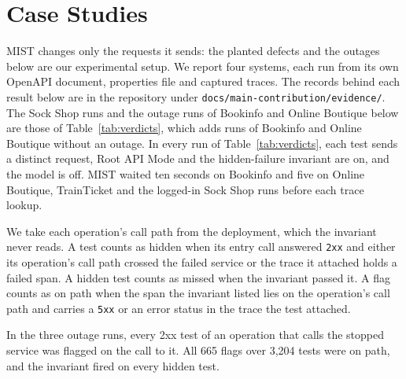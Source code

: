 \documentclass[10pt,conference]{IEEEtran}
\begin{document}
\section{Case Studies}\label{sec:case}

MIST changes only the requests it sends: the planted defects and the outages below are our experimental setup. We report four systems, each run from its own OpenAPI \mbox{document}, properties file and captured traces. The records behind each result below are in the repository under \texttt{docs/\allowbreak main-contribution/\allowbreak evidence/}. The Sock Shop runs and the outage runs of Bookinfo and Online Boutique below are those of Table~\ref{tab:verdicts}, which adds runs of Bookinfo and Online Boutique without an outage. In every run of Table~\ref{tab:verdicts}, each test sends a distinct request, Root API Mode and the hidden-failure invariant are on, and the model is off. MIST waited ten seconds on Bookinfo and five on Online Boutique, TrainTicket and the logged-in Sock Shop runs before each trace lookup.

We take each operation's call path from the deployment, which the invariant never reads. A test counts as hidden when its entry call answered \texttt{2xx} and either its operation's call path crossed the failed service or the trace it attached holds a failed span. A hidden test counts as missed when the invariant passed it. A flag counts as on path when the span the invariant listed lies on the operation's call path and carries a \texttt{5xx} or an error status in the trace the test attached.

In the three outage runs, every 2xx test of an operation that calls the stopped service was flagged on the call to it. All 665 flags over 3,204 tests were on path, and the invariant fired on every hidden test.
\end{document}
